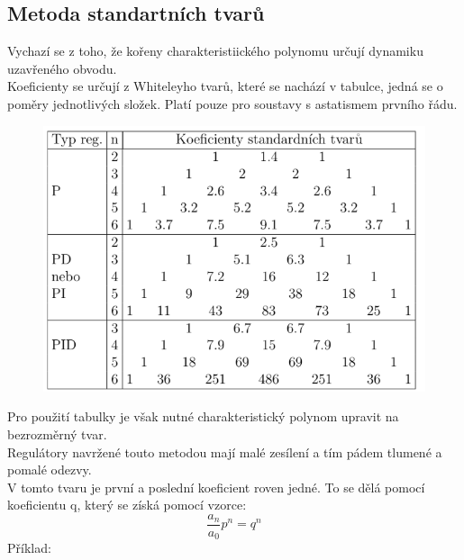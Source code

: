 \subsection*{Metoda standartních tvarů}
Vychazí se z toho, že kořeny charakteristiického polynomu určují dynamiku uzavřeného obvodu.\\
Koeficienty se určují z Whiteleyho tvarů, které se nachází v tabulce, jedná se o poměry jednotlivých složek. Platí pouze pro soustavy s astatismem prvního řádu.\\
\begin{figure}[H]
    \centering
    \includegraphics*[scale = 0.8]{images/metodaStandartnichTvaru.png}
\end{figure}
Pro použití tabulky je však nutné charakteristický polynom upravit na bezrozměrný tvar.\\
Regulátory navržené touto metodou mají malé zesílení a tím pádem tlumené a pomalé odezvy.\\
V tomto tvaru je první a poslední koeficient roven jedné. To se dělá pomocí koeficientu q, který se získá pomocí vzorce:
\begin{equation}
    \frac{a_n}{a_0}p^n = q^n
\end{equation}
Příklad:\\
